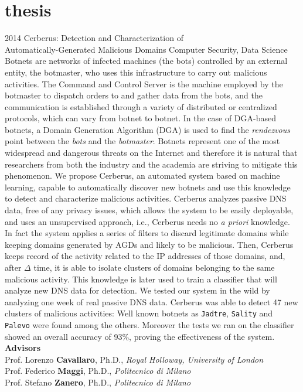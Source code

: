 \documentclass[]{friggeri-cv} %
\begin{document}

\section{thesis}

\begin{entrylist}
\entry
{2014}
{Cerberus: Detection and Characterization of \\ Automatically-Generated Malicious Domains}
{Computer Security, Data Science}
{Botnets are networks of infected machines (the bots) controlled
by an external entity, the botmaster, who uses this infrastructure to
carry out malicious activities. The Command and Control Server is the machine
employed by the botmaster to dispatch orders to and gather data from the bots,
and the communication is established through a variety of distributed or
centralized protocols, which can vary from botnet to botnet. In the case of
DGA-based botnets, a Domain Generation Algorithm (DGA) is used to find the
\emph{rendezvous} point between the \emph{bots} and the \emph{botmaster}.
Botnets represent one of the most widespread and dangerous threats on the Internet and
therefore it is natural that researchers from both the industry and the academia
are striving to mitigate this phenomenon.
We propose Cerberus, an automated system based on machine learning, capable to automatically discover new botnets and use this
knowledge to detect and characterize malicious activities. Cerberus analyzes passive
DNS data, free of any privacy issues, which allows the system to be easily
deployable, and uses an unsupervised approach, i.e., Cerberus needs no
\emph{a priori} knowledge. In fact the system applies a series of filters to
discard legitimate domains while keeping domains generated by AGDs and likely to be malicious. Then, Cerberus
keeps record of the activity related to the IP addresses of those domains, and,
after $\Delta$ time, it is able to isolate clusters of domains belonging to the same
malicious activity. This knowledge is later used to train a classifier that will analyze
new DNS data for detection.
We tested our system in the wild by analyzing one week of real passive DNS data.
Cerberus was able to detect 47 new clusters of malicious activities: Well
known botnets as \texttt{Jadtre}, \texttt{Sality} and \texttt{Palevo} were found among the others.
Moreover the tests we ran on the classifier showed an overall accuracy of 93\%, proving
the effectiveness of the system. \\

\textbf{Advisors}\\
Prof. Lorenzo \textbf{Cavallaro}, Ph.D., \emph{Royal Holloway, University of London} \\
Prof. Federico \textbf{Maggi}, Ph.D., \emph{Politecnico di Milano} \\
Prof. Stefano \textbf{Zanero}, Ph.D., \emph{Politecnico di Milano}}
\end{entrylist}
\end{document}
